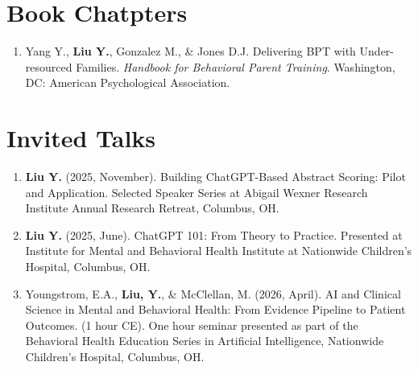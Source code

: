\documentclass[12pt]{article}
\begin{document}
\section{Book Chatpters}
\begin{enumerate} [left=1em]
    \item Yang Y., \textbf{Liu Y.}, Gonzalez M., \& Jones D.J. Delivering BPT with Under-resourced Families. \textit{Handbook for Behavioral Parent Training}. Washington, DC: American Psychological Association.
\end{enumerate}

\section{Invited Talks}
\begin{enumerate} [left=1em]
    \item \textbf{Liu Y.} (2025, November). Building ChatGPT-Based Abstract Scoring: Pilot and Application. Selected Speaker Series at Abigail Wexner Research Institute Annual Research Retreat, Columbus, OH.

    \item \textbf{Liu Y.} (2025, June). ChatGPT 101: From Theory to Practice. Presented at Institute for Mental and Behavioral Health Institute at Nationwide Children's Hospital, Columbus, OH.

    \item Youngstrom, E.A., \textbf{Liu, Y.}, \& McClellan, M. (2026, April). AI and Clinical Science in Mental and Behavioral Health: From Evidence Pipeline to Patient Outcomes. (1 hour CE). One hour seminar presented as part of the Behavioral Health Education Series in Artificial Intelligence, Nationwide Children’s Hospital, Columbus, OH.
\end{enumerate}
\end{document}
